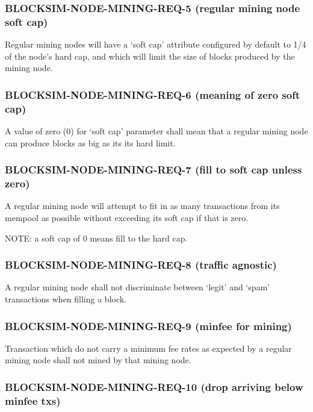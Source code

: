 \documentclass{scrreprt}
\begin{document}
\subsubsection{BLOCKSIM-NODE-MINING-REQ-5 (regular mining node soft cap)}

Regular mining nodes will have a `soft cap' attribute configured by default to
1/4 of the node's hard cap, and which will limit the size of blocks produced
by the mining node.


\subsubsection{BLOCKSIM-NODE-MINING-REQ-6 (meaning of zero soft cap)}

A value of zero (0) for `soft cap' parameter shall mean that a regular mining
node can produce blocks as big as its its hard limit.


\subsubsection{BLOCKSIM-NODE-MINING-REQ-7 (fill to soft cap unless zero)}

A regular mining node will attempt to fit in as many transactions from its mempool
as possible without exceeding its soft cap if that is zero.

NOTE: a soft cap of 0 means fill to the hard cap.


\subsubsection{BLOCKSIM-NODE-MINING-REQ-8 (traffic agnostic)}

A regular mining node shall not discriminate between `legit' and `spam' transactions
when filling a block.

\subsubsection{BLOCKSIM-NODE-MINING-REQ-9 (minfee for mining)}

Transaction which do not carry a minimum fee rates as expected by a regular mining
node shall not mined by that mining node.


\subsubsection{BLOCKSIM-NODE-MINING-REQ-10 (drop arriving below minfee txs)}
\end{document}
